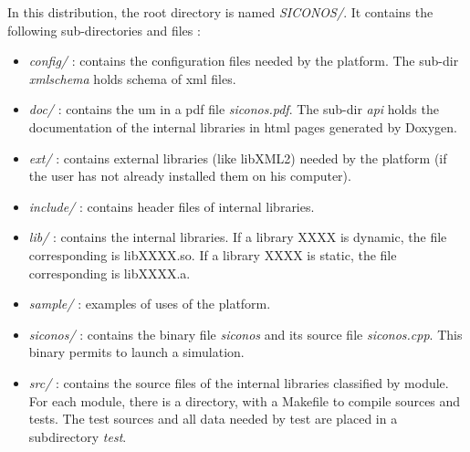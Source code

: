 In this distribution, the root directory is named \textit{SICONOS/}. It contains the following sub-directories and files : 
\begin{itemize}

\item  \textit{config/} : contains the configuration files needed by the platform. The sub-dir \textit{xmlschema} holds schema of \ac{xml} files.

\item  \textit{doc/} : contains the \ac{um} in a pdf file \textit{siconos.pdf}. The sub-dir \textit{api} holds the documentation of the internal libraries in html pages generated by Doxygen.

\item \textit{ext/} : contains external libraries (like libXML2) needed by the platform (if the user has not already installed them on his computer).

\item \textit{include/} : contains header files of internal libraries.

\item \textit{lib/} : contains the internal libraries. If a library XXXX is dynamic, the file corresponding is libXXXX.so. If a library XXXX is static, the file corresponding is libXXXX.a.

\item \textit{sample/} : examples of uses of the platform.

\item \textit{siconos/} : contains the binary file \textit{siconos} and its source file \textit{siconos.cpp}. This binary permits to launch a simulation.

\item \textit{src/} : contains the source files of the internal libraries classified by module. For each module, there is a directory, with a Makefile to compile sources and tests. The test sources and all data needed by test are placed in a subdirectory \textit{test}.
	



\end{itemize}
